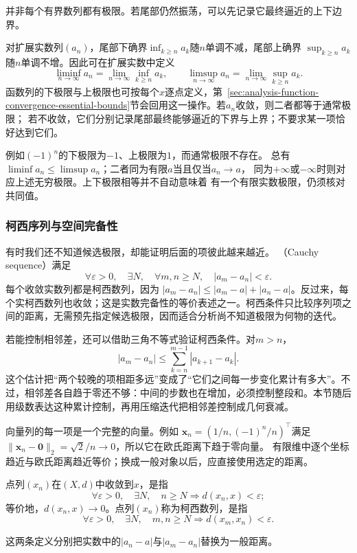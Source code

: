 并非每个有界数列都有极限。若尾部仍然振荡，可以先记录它最终逼近的上下边界。

\begin{definition}[数列的上极限与下极限]
\label{def:analysis-liminf-limsup}
对扩展实数列$(a_n)$，尾部下确界$\inf_{k\geq n}a_k$随$n$单调不减，尾部上确界
$\sup_{k\geq n}a_k$随$n$单调不增。因此可在扩展实数中定义
\[
  \liminf_{n\to\infty}a_n
  =
  \lim_{n\to\infty}\inf_{k\geq n}a_k,
  \qquad
  \limsup_{n\to\infty}a_n
  =
  \lim_{n\to\infty}\sup_{k\geq n}a_k.
\]
函数列的下极限与上极限也可按每个$x$逐点定义，第~\ref{sec:analysis-function-convergence-essential-bounds}节会回用这一操作。若$a_n$收敛，则二者都等于通常极限；
若不收敛，它们分别记录尾部最终能够逼近的下界与上界；不要求某一项恰好达到它们。
\end{definition}
例如$(-1)^n$的下极限为$-1$、上极限为$1$，而通常极限不存在。
总有$\liminf a_n\leq\limsup a_n$；二者同为有限$a$当且仅当$a_n\to a$，
同为$+\infty$或$-\infty$时则对应上述无穷极限。上下极限相等并不自动意味着
有一个有限实数极限，仍须核对共同值。


\subsubsection{柯西序列与空间完备性}
有时我们还不知道候选极限，却能证明后面的项彼此越来越近。
（Cauchy sequence）满足
\[   \forall\varepsilon>0,\quad   \exists N,\quad   \forall m,n\geq N,\quad |a_m-a_n|<\varepsilon. \]
每个收敛实数列都是柯西数列，因为 $|a_m-a_n|\leq|a_m-a|+|a_n-a|$。反过来，每个实柯西数列也收敛；这是实数完备性的等价表述之一。柯西条件只比较序列项之间的距离，无需预先指定候选极限，因而适合分析尚不知道极限为何物的迭代。

若能控制相邻差，还可以借助三角不等式验证柯西条件。对$m>n$，
\begin{equation}
  |a_m-a_n|
  \leq
  \sum_{k=n}^{m-1}|a_{k+1}-a_k|.
\label{eq:analysis-cauchy-tail-bound}
\end{equation}
这个估计把“两个较晚的项相距多远”变成了“它们之间每一步变化累计有多大”。不过，相邻差各自趋于零还不够：中间的步数也在增加，必须控制整段和。本节随后用级数表达这种累计控制，再用压缩迭代把相邻差控制成几何衰减。


向量列的每一项是一个完整的向量。例如
$\bm x_n=(1/n,(-1)^n/n)^\top$满足
$\lVert\bm x_n-\bm0\rVert_2=\sqrt2/n\to0$，所以它在欧氏距离下趋于零向量。
有限维中逐个坐标趋近与欧氏距离趋近等价；换成一般对象以后，应直接使用选定的距离。
\begin{definition}[度量空间中的收敛与柯西数列]
\label{def:analysis-metric-sequence-convergence}
点列$(x_n)$在$(X,d)$中收敛到$x$，是指
\[
  \forall\varepsilon>0,\quad
  \exists N,\quad
  n\geq N\Longrightarrow d(x_n,x)<\varepsilon;
\]
等价地，$d(x_n,x)\to0$。点列$(x_n)$称为柯西数列，是指
\[
  \forall\varepsilon>0,\quad
  \exists N,\quad
  m,n\geq N\Longrightarrow d(x_m,x_n)<\varepsilon.
\]
\end{definition}
这两条定义分别把实数中的$|a_n-a|$与$|a_m-a_n|$替换为一般距离。

